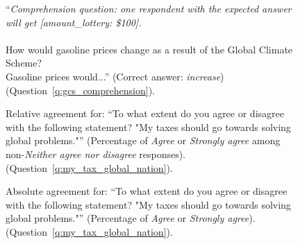 \begin{figure}[h!]
    \caption[Comprehension question on GCS]{``\textit{Comprehension question: one respondent with the expected answer will get [amount\_lottery: \$100].}\\\\How would gasoline prices change as a result of the Global Climate Scheme? \\Gasoline prices would...'' (Correct answer: \textit{increase}) (Question~\ref{q:gcs_comprehension}).
    }\label{fig:gcs_comprehension}
\end{figure}

\begin{figure}[h!]
    \caption[Relative agreement: ``My taxes should go towards solving global problems'']{Relative agreement for: ``To what extent do you agree or disagree with the following statement? "My taxes should go towards solving global problems."'' (Percentage of \textit{Agree} or \textit{Strongly agree} among non-\textit{Neither agree nor disagree} responses). (Question~\ref{q:my_tax_global_nation}).
    }\label{fig:my_tax_global_nation_share}
\end{figure}

\begin{figure}[h!]
    \caption[Absolute agreement: ``My taxes should go towards solving global problems'']{Absolute agreement for: ``To what extent do you agree or disagree with the following statement? "My taxes should go towards solving global problems."'' (Percentage of \textit{Agree} or \textit{Strongly agree}). (Question~\ref{q:my_tax_global_nation}).
    }\label{fig:my_tax_global_nation_positive}
\end{figure}

